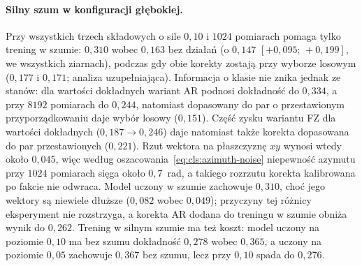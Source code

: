 \paragraph{Silny szum w konfiguracji głębokiej.}
Przy wszystkich trzech składowych o sile $0{,}10$ i $1024$ pomiarach pomaga tylko trening w szumie: $0{,}310$ wobec $0{,}163$ bez działań (o $0{,}147$ $[+0{,}095;\,+0{,}199]$, we wszystkich ziarnach), podczas gdy obie korekty zostają przy wyborze losowym ($0{,}177$ i $0{,}171$; analiza uzupełniająca).
Informacja o klasie nie znika jednak ze stanów: dla wartości dokładnych wariant AR podnosi dokładność do $0{,}334$, a przy $8192$ pomiarach do $0{,}244$, natomiast dopasowany do par o przestawionym przyporządkowaniu daje wybór losowy ($0{,}151$).
Część zysku wariantu FZ dla wartości dokładnych ($0{,}187\to0{,}246$) daje natomiast także korekta dopasowana do par przestawionych ($0{,}221$).
Rzut wektora na płaszczyznę $xy$ wynosi wtedy około $0{,}045$, więc według oszacowania~\eqref{eq:cls:azimuth-noise} niepewność azymutu przy $1024$ pomiarach sięga około $0{,}7$~rad, a takiego rozrzutu korekta kalibrowana po fakcie nie odwraca.
Model uczony w szumie zachowuje $0{,}310$, choć jego wektory są niewiele dłuższe ($0{,}082$ wobec $0{,}049$); przyczyny tej różnicy eksperyment nie rozstrzyga, a korekta AR dodana do treningu w szumie obniża wynik do $0{,}262$.
Trening w silnym szumie ma też koszt: model uczony na poziomie $0{,}10$ ma bez szumu dokładność $0{,}278$ wobec $0{,}365$, a uczony na poziomie $0{,}05$ zachowuje $0{,}367$ bez szumu, lecz przy $0{,}10$ spada do $0{,}276$.

